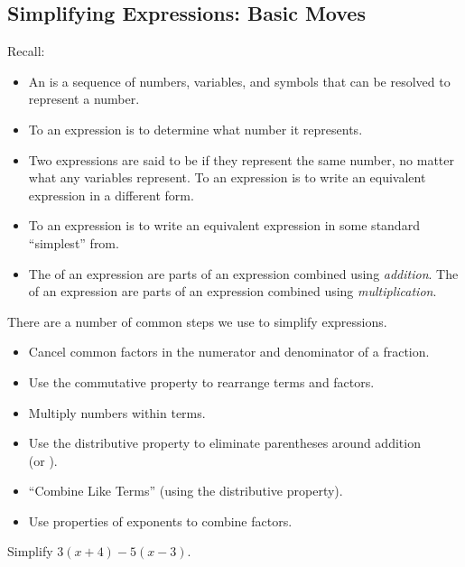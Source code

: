 \subsection{Simplifying Expressions: Basic Moves} 
Recall:
\begin{definition}
\begin{itemize}
\item An  is a sequence of numbers, variables, and symbols that can be resolved to represent a number.
\item To  an expression is to determine what number it represents.
\item Two expressions are said to be  if they represent the same number, no matter what any variables represent. To  an expression is to write an equivalent expression in a different form.
\item To  an expression is to write an equivalent expression in some standard ``simplest'' from.
\item The  of an expression are parts of an expression combined using \emph{addition}. The  of an expression are parts of an expression combined using \emph{multiplication}.
\end{itemize}
\end{definition}
There are a number of common steps we use to simplify expressions.
\begin{itemize}
\item Cancel common factors in the numerator and denominator of a fraction.
\item Use the commutative property to rearrange terms and factors.
\item Multiply numbers within terms.
\item Use the distributive property to eliminate parentheses around addition\\(or \makeblank).
\item ``Combine Like Terms'' (using the distributive property).
\item Use properties of exponents to combine factors.
\end{itemize}
\begin{Example}{Simplify $3(x+4)-5(x-3)$.}
\end{Example}